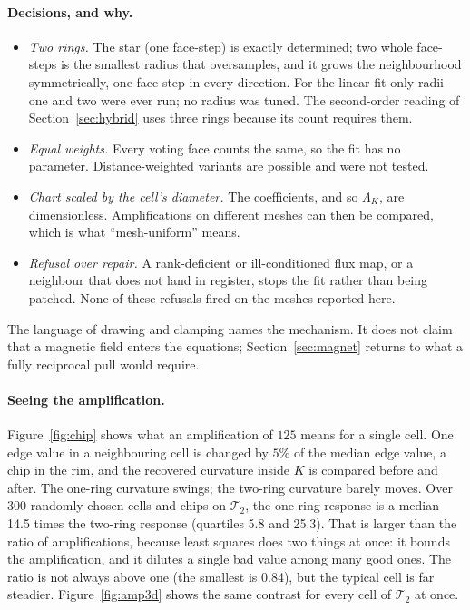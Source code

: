 \documentclass[11pt]{article}
\theoremstyle{definition}
\theoremstyle{remark}
\newcommand{\T}{\mathcal{T}}
\begin{document}
\paragraph{Decisions, and why.}
\begin{itemize}
  \item \emph{Two rings.} The star (one face-step) is exactly determined; two whole
    face-steps is the smallest radius that oversamples, and it grows the neighbourhood
    symmetrically, one face-step in every direction. For the linear fit only radii
    one and two were ever run; no radius was tuned. The second-order reading of
    Section~\ref{sec:hybrid} uses three rings because its count requires them.
  \item \emph{Equal weights.} Every voting face counts the same, so the fit has no
    parameter. Distance-weighted variants are possible and were not tested.
  \item \emph{Chart scaled by the cell's diameter.} The coefficients, and so $\Lambda_K$,
    are dimensionless. Amplifications on different meshes can then be compared, which is
    what ``mesh-uniform'' means.
  \item \emph{Refusal over repair.} A rank-deficient or ill-conditioned flux map, or a
    neighbour that does not land in register, stops the fit rather than being patched.
    None of these refusals fired on the meshes reported here.
\end{itemize}

The language of drawing and clamping names the mechanism. It does not claim that a
magnetic field enters the equations; Section~\ref{sec:magnet} returns to what a
fully reciprocal pull would require.

\paragraph{Seeing the amplification.} Figure~\ref{fig:chip} shows what an amplification
of $125$ means for a single cell. One edge value in a neighbouring cell is changed by $5\%$
of the median edge value, a chip in the rim, and the recovered curvature inside $K$ is
compared before and after. The one-ring curvature swings; the two-ring curvature barely
moves. Over 300 randomly chosen cells and chips on $\T_2$, the one-ring response is a median
14.5 times the two-ring response (quartiles 5.8 and 25.3). That is larger than the
ratio of amplifications, because least squares does two things at once: it bounds the
amplification, and it dilutes a single bad value among many good ones. The ratio is not
always above one (the smallest is 0.84), but the typical cell is far steadier.
Figure~\ref{fig:amp3d} shows the same contrast for every cell of $\T_2$ at once.
\end{document}
